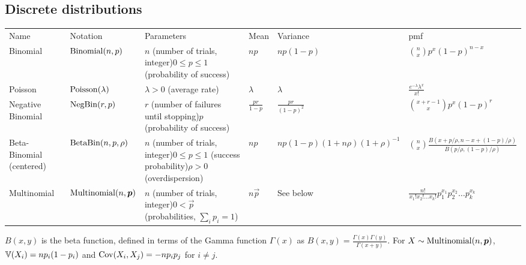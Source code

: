 \documentclass[thesis.tex]{subfiles}
\begin{document}
\begin{landscape}
\section{Discrete distributions}
\begin{tabular}{llp{3.5cm}lll}
Name & Notation & Parameters & Mean & Variance & pmf \\
Binomial & $\operatorname{Binomial}(n, p)$ & $n$ (number of trials, integer)\newline $0 \leq p \leq 1$ (probability of success) & $np$ & $np(1-p)$ & ${n \choose x}p^x(1-p)^{n-x}$ \\
Poisson & $\operatorname{Poisson}(\lambda)$ & $\lambda > 0$ (average rate) & $\lambda$ & $\lambda$ & $\frac{e^{-\lambda}\lambda^x}{x!}$ \\
Negative Binomial & $\operatorname{NegBin}(r, p)$ & $r$ (number of failures until stopping)\newline $p$ (probability of success) & $\frac{pr}{1-p}$ & $\frac{pr}{(1-p)^2}$ & ${x + r - 1 \choose x} p^x (1-p)^r$ \\
Beta-Binomial (centered) & $\operatorname{BetaBin}(n, p, \rho)$ & $n$ (number of trials, integer)\newline $0 \leq p \leq 1$ (success probability)\newline $\rho > 0$ (overdispersion) & $np$ & $np(1-p)(1+n\rho)(1+\rho)^{-1}$ & ${n \choose x} \frac{B(x+p/\rho, n-x+(1-p)/\rho)}{B(p/\rho, (1-p)/\rho)}$ \\
Multinomial & $\operatorname{Multinomial}(n, \bm{p})$ & $n$ (number of trials, integer)\newline $0 < \vec{p}$ (probabilities, $\sum_i p_i = 1$) & $n \vec{p}$ & See below & $\frac{n!}{x_1!x_2!\ldots x_k!}p_1^{x_1}p_2^{x_2}\ldots p_k^{x_k}$ \\
\end{tabular}
$B(x,y)$ is the beta function, defined in terms of the Gamma function $\Gamma(x)$ as $B(x,y) = \frac{\Gamma(x)\Gamma(y)}{\Gamma(x+y)}$.
For $X \sim \operatorname{Multinomial}(n, \bm{p})$, $\operatorname{\mathbb{V}}(X_i) = np_i(1-p_i)$ and $\operatorname{Cov}(X_i, X_j) = -np_ip_j$ for $i \neq j$.
\end{landscape}
\end{document}
